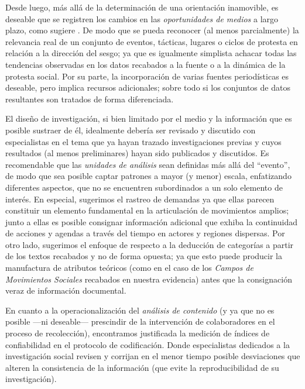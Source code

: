 \documentclass[letterpaper, 11pt]{book}
\theoremstyle{definition}
\theoremstyle{remark}
\begin{document}
Desde luego, más allá de la determinación de una orientación inamovible, es deseable que se registren los cambios en las \emph{oportunidades de medios} a largo plazo, como sugiere \citet{2003_Wada_Tesis}. 
De modo que se pueda reconocer (al menos parcialmente) la relevancia real de un conjunto de eventos, tácticas, lugares o ciclos de protesta en relación a la dirección del sesgo; ya que es igualmente simplista achacar todas las tendencias observadas en los datos recabados a la fuente o a la dinámica de la protesta social. 
Por su parte, la incorporación de varias fuentes periodísticas es deseable, pero implica recursos adicionales; sobre todo si los conjuntos de datos resultantes son tratados de forma diferenciada. 


El diseño de investigación, si bien limitado por el medio y la información que es posible sustraer de él, idealmente debería ser revisado y discutido con especialistas en el tema que ya hayan trazado investigaciones previas y cuyos resultados (al menos preliminares) hayan sido publicados y discutidos. 
Es recomendable que las \emph{unidades de análisis} sean definidas más allá del ``evento'', de modo que sea posible captar patrones a mayor (y menor) escala, enfatizando diferentes aspectos, que no se encuentren subordinados a un solo elemento de interés. 
En especial, sugerimos el rastreo de demandas ya que ellas parecen constituir un elemento fundamental en la articulación de movimientos amplios; junto a ellas es posible consignar información adicional que exhiba la continuidad de acciones y agendas a través del tiempo en actores y regiones dispersas. 
Por otro lado, sugerimos el enfoque de \citet{2003_Wada_Tesis} respecto a la deducción de categorías a partir de los textos recabados y no de forma opuesta; ya que esto puede producir la manufactura de atributos teóricos (como en el caso de los \emph{Campos de Movimientos Sociales} recabados en nuestra evidencia) antes que la consignación veraz de información documental. 


En cuanto a la operacionalización del \emph{análisis de contenido} (y ya que no es posible ---ni deseable--- prescindir de la intervención de colaboradores en el proceso de recolección), encontramos justificada la medición de índices de confiabilidad en el protocolo de codificación. 
Donde especialistas dedicados a la investigación social revisen y corrijan en el menor tiempo posible desviaciones que alteren la consistencia de la información (que evite la reproducibilidad de su investigación). 
\end{document}
